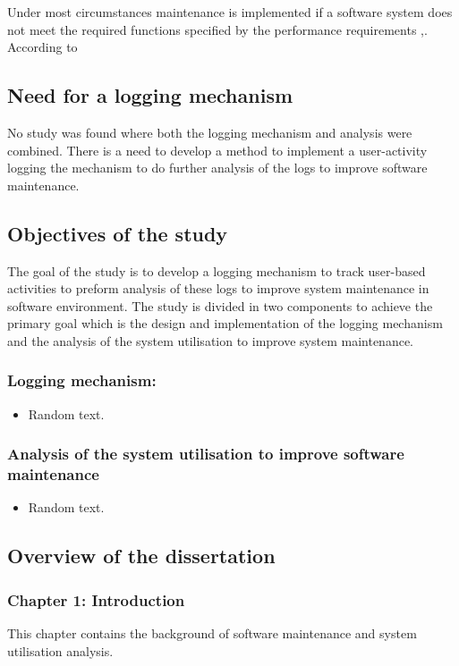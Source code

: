 Under most circumstances maintenance is implemented if a software system does not meet the required functions specified by the performance requirements \cite{Ogheneovo2014},\cite{Sneed2004}. According to 

\newpage

\subsection{Need for a logging mechanism}
No study was found where both the logging mechanism and analysis were combined.
There is a need to develop a method to implement a user-activity logging
the mechanism to do further analysis of the logs to improve software
maintenance.

\subsection{Objectives of the study}
The goal of the study is to develop a logging mechanism to track user-based
activities to preform analysis of these logs to improve system maintenance in
software environment. The study is divided in two components to achieve the
primary goal which is the design and implementation of the logging mechanism
and the analysis of the system utilisation to improve system maintenance.

\subsubsection{Logging mechanism:}
\begin{itemize}
    \item Random text.
\end{itemize}

\subsubsection{Analysis of the system utilisation to improve software maintenance}
\begin{itemize}
    \item Random text.
\end{itemize}

\subsection{Overview of the dissertation}
\subsubsection{Chapter 1: Introduction}
This chapter contains the background of software maintenance and system
utilisation analysis.
